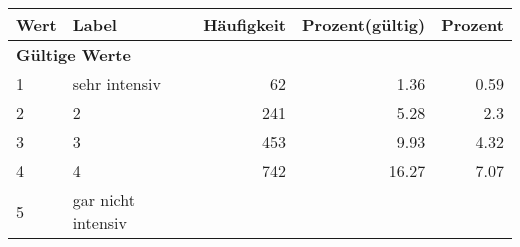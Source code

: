      \begin{longtable}{lXrrr}
     \toprule
     \textbf{Wert} & \textbf{Label} & \textbf{Häufigkeit} & \textbf{Prozent(gültig)} & \textbf{Prozent} \\
     \endhead
     \midrule
     \multicolumn{5}{l}{\textbf{Gültige Werte}}\\

     1 &
     \multicolumn{1}{X}{ sehr intensiv   } &


       \num{62} &
       \num[round-mode=places,round-precision=2]{1.36} &
         \num[round-mode=places,round-precision=2]{0.59} \\

     2 &
     \multicolumn{1}{X}{ 2   } &


       \num{241} &
       \num[round-mode=places,round-precision=2]{5.28} &
         \num[round-mode=places,round-precision=2]{2.3} \\

     3 &
     \multicolumn{1}{X}{ 3   } &


       \num{453} &
       \num[round-mode=places,round-precision=2]{9.93} &
         \num[round-mode=places,round-precision=2]{4.32} \\

     4 &
     \multicolumn{1}{X}{ 4   } &


       \num{742} &
       \num[round-mode=places,round-precision=2]{16.27} &
         \num[round-mode=places,round-precision=2]{7.07} \\

     5 &
     \multicolumn{1}{X}{ gar nicht intensiv   } &



\end{longtable}
